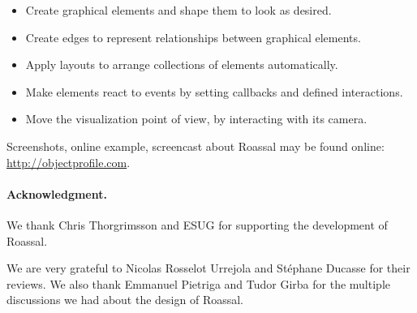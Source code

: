 \documentclass[a4paper,10pt,twoside]{book}
\begin{document}
\begin{itemize}
\item Create graphical elements and shape them to look as desired.
\item Create edges to represent relationships between graphical elements.
\item Apply layouts to arrange collections of elements automatically.
\item Make elements react to events by setting callbacks and defined interactions.
\item Move the visualization point of view, by interacting with its camera.
\end{itemize}

Screenshots, online example, screencast about Roassal may be found online: \url{http://objectprofile.com}.

\paragraph{Acknowledgment.}
We thank Chris Thorgrimsson and ESUG for supporting the development of Roassal.

We are very grateful to Nicolas Rosselot Urrejola and St\'ephane Ducasse for their reviews. We also thank Emmanuel Pietriga and Tudor Girba for the multiple discussions we had about the design of Roassal. 

%
%


\ifx\wholebook\relax\else
   
   
\end{document}
